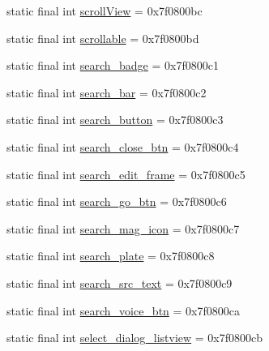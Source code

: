 \begin{DoxyCompactItemize}
\item 
static final int \mbox{\hyperlink{classandroid_1_1support_1_1design_1_1_r_1_1id_a2de3dd9900590ae7787cfd98c2902697}{scroll\+View}} = 0x7f0800bc
\item 
static final int \mbox{\hyperlink{classandroid_1_1support_1_1design_1_1_r_1_1id_a0a5991f478e0a41ee7785532f90a42c4}{scrollable}} = 0x7f0800bd
\item 
static final int \mbox{\hyperlink{classandroid_1_1support_1_1design_1_1_r_1_1id_ab0e2b2d083c20f23f39c4fe0349968c3}{search\+\_\+badge}} = 0x7f0800c1
\item 
static final int \mbox{\hyperlink{classandroid_1_1support_1_1design_1_1_r_1_1id_a0179560e777b05cd454e5ef1a4440d8a}{search\+\_\+bar}} = 0x7f0800c2
\item 
static final int \mbox{\hyperlink{classandroid_1_1support_1_1design_1_1_r_1_1id_ad73247be7f6a487b058f4d433c817d62}{search\+\_\+button}} = 0x7f0800c3
\item 
static final int \mbox{\hyperlink{classandroid_1_1support_1_1design_1_1_r_1_1id_a5e6590cb31c93c114ae749b14d1755d2}{search\+\_\+close\+\_\+btn}} = 0x7f0800c4
\item 
static final int \mbox{\hyperlink{classandroid_1_1support_1_1design_1_1_r_1_1id_ab4106953fa5afe73dbdda5b502b4b31f}{search\+\_\+edit\+\_\+frame}} = 0x7f0800c5
\item 
static final int \mbox{\hyperlink{classandroid_1_1support_1_1design_1_1_r_1_1id_afceae185876ccb35a694edeebe51c5a6}{search\+\_\+go\+\_\+btn}} = 0x7f0800c6
\item 
static final int \mbox{\hyperlink{classandroid_1_1support_1_1design_1_1_r_1_1id_a2aaecfd3a9dd6e4c3349e5f26561d0c7}{search\+\_\+mag\+\_\+icon}} = 0x7f0800c7
\item 
static final int \mbox{\hyperlink{classandroid_1_1support_1_1design_1_1_r_1_1id_a718e248d6d7959bcfb7577c8a169160f}{search\+\_\+plate}} = 0x7f0800c8
\item 
static final int \mbox{\hyperlink{classandroid_1_1support_1_1design_1_1_r_1_1id_a2359a86e57bfe8d942fd216893170d78}{search\+\_\+src\+\_\+text}} = 0x7f0800c9
\item 
static final int \mbox{\hyperlink{classandroid_1_1support_1_1design_1_1_r_1_1id_af93508c1f5a72931efe0477e848c207f}{search\+\_\+voice\+\_\+btn}} = 0x7f0800ca
\item 
static final int \mbox{\hyperlink{classandroid_1_1support_1_1design_1_1_r_1_1id_a8f804d5354b7fe1dbec4597297918e38}{select\+\_\+dialog\+\_\+listview}} = 0x7f0800cb
\item 

\end{DoxyCompactItemize}
